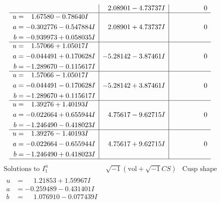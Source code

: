 \documentclass[1p]{elsarticle_modified}
\theoremstyle{definition}
\newcommand{\I}{\sqrt{-1}}
\begin{document}
$$\begin{array}{c|c|c}
 & \phantom{-}2.08901 - 4.73737 I & \phantom{-0.000000 } 0 \\ \hline\begin{aligned}
u &= \phantom{-}1.67580 - 0.78640 I \\
a &= -0.302776 - 0.547884 I \\
b &= -0.939973 + 0.058035 I\end{aligned}
 & \phantom{-}2.08901 + 4.73737 I & \phantom{-0.000000 } 0 \\ \hline\begin{aligned}
u &= \phantom{-}1.57066 + 1.05017 I \\
a &= -0.044491 + 0.170628 I \\
b &= -1.289670 - 0.115617 I\end{aligned}
 & -5.28142 - 3.87461 I & \phantom{-0.000000 } 0 \\ \hline\begin{aligned}
u &= \phantom{-}1.57066 - 1.05017 I \\
a &= -0.044491 - 0.170628 I \\
b &= -1.289670 + 0.115617 I\end{aligned}
 & -5.28142 + 3.87461 I & \phantom{-0.000000 } 0 \\ \hline\begin{aligned}
u &= \phantom{-}1.39276 + 1.40193 I \\
a &= -0.022664 + 0.655944 I \\
b &= -1.246490 - 0.418023 I\end{aligned}
 & \phantom{-}4.75617 - 9.62715 I & \phantom{-0.000000 } 0 \\ \hline\begin{aligned}
u &= \phantom{-}1.39276 - 1.40193 I \\
a &= -0.022664 - 0.655944 I \\
b &= -1.246490 + 0.418023 I\end{aligned}
 & \phantom{-}4.75617 + 9.62715 I & \phantom{-0.000000 } 0\\
 \hline 
 \end{array}$$\newpage$$\begin{array}{c|c|c}  
\text{Solutions to }I^u_{1}& \I (\text{vol} + \sqrt{-1}CS) & \text{Cusp shape}\\
 \hline 
\begin{aligned}
u &= \phantom{-}1.21853 + 1.59967 I \\
a &= -0.259489 - 0.431401 I \\
b &= \phantom{-}1.076910 - 0.077439 I\end{aligned}

\end{array}$$
\end{document}
